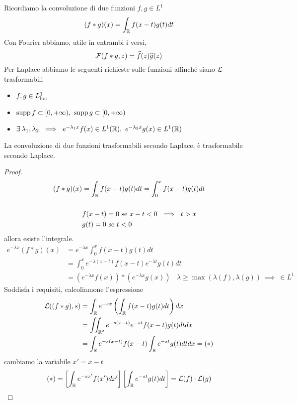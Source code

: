 Ricordiamo la convoluzione di due funzioni $f, g\in L^{1}$
\begin{equation*}
(f*g)(x) = \int_{\mathbb{R}} f(x - t) g(t) dt
\end{equation*}
Con Fourier abbiamo, utile in entrambi i versi,
\begin{equation*}
\mathcal{F}(f*g, z) = \widehat{f}(z)\widehat{g}(z)
\end{equation*}
Per Laplace abbiamo le seguenti richieste sulle funzioni affinché siano $\mathcal{L}$ - trasformabili
\begin{itemize}
\item $f, g\in L^{1}_{\operatorname{loc}}$
\item $\operatorname*{supp} f\subset [0, + \infty), \ \operatorname*{supp} g\subset [0, + \infty)$
\item $\exists \lambda_{1}, \lambda_{2} \ \implies \ e^{- \lambda_{1} x} f(x) \in L^{1}(\RR), \ e^{- \lambda_{2} x} g(x) \in L^{1}(\RR)$
\end{itemize}
\begin{thm}
La convoluzione di due funzioni trasformabili secondo Laplace, è trasformabile secondo Laplace.
\end{thm}
\begin{proof}
\begin{equation*}
\begin{aligned}
(f*g)(x) & = \int_{\mathbb{R}} f(x - t) g(t) dt = \int^{x}_{0} f(x - t) g(t) dt\\
 & \\
 & f(x - t) = 0\ \text{se} \ x - t < 0\ \implies \ t > x\\
 & g(t) = 0\ \text{se} \ t < 0
\end{aligned}
\end{equation*}
allora esiste l'integrale.
\begin{equation*}
\begin{aligned}
e^{- \lambda x}(f*g)(x) & = e^{- \lambda x}\int^{x}_{0} f(x - t) g(t) dt\\
 & = \int^{x}_{0} e^{- \lambda (x - t)} f(x - t) e^{- \lambda t} g(t) dt\\
 & = \left(e^{- \lambda x} f(x)\right) *\left(e^{- \lambda x} g(x)\right) \ \ \ \ \lambda \geq \max(\lambda (f), \lambda (g)) \ \implies \ \in L^{1}
\end{aligned}
\end{equation*}
Soddisfa i requisiti, calcoliamone l'espressione
\begin{align*}
\mathcal{L}((f*g), s) & = \int_{\mathbb{R}} e^{- sx}\left(\int_{\mathbb{R}} f(x - t) g(t) dt\right) dx\\
 & = \iint_{\mathbb{R}^{2}} e^{- s(x - t)} e^{- st} f(x - t) g(t) dtdx\\
 & = \int_{\mathbb{R}} e^{- s(x - t)} f(x - t)\int_{\mathbb{R}} e^{- st} g(t) dtdx = (*)
\end{align*}
cambiamo la variabile $x' = x - t$
\begin{gather*}
(*) = \left[\int_{\mathbb{R}} e^{- sx'} f(x') dx'\right]\left[\int_{\mathbb{R}} e^{- st} g(t) dt\right] = \mathcal{L}(f) \cdot \mathcal{L}(g)
\end{gather*}
\end{proof}

